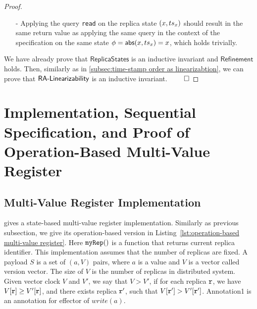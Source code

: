 \begin {proof}
\begin{itemize}
    Assume that $\alinord = \alabel''_1 \cdot \ldots \cdot \alabel''_m \cdot \alabel''_{m+1} \ldots$, $\alabel''_{m+1} = \alabellongind[{\tt write}]{a}{}{\ats_a}{}$. We already know that, the timestamp of $\alabel''_1,\ldots,\alabel''_m$ is less than $\ats_a$. Assume $S$ is obtained by applying the effectors of $\alabel''_1,\ldots,\alabel''_m$, and assume that $S = (x,\ats_x)$. It is easy to see that, $\ats_x < \ats_a$.

    Assume we obtain replica state $S'$ from $S$ by applying effector $(a,\ats_a)$; while in sequential specification we have $\abstate \xrightarrow{\alabelshort[{\tt write}]{a}} \abstate'$, and $\refmap(x,\ats_x) = \abstate = x$. We can see that $S' = (a,\ats_a)$ and $\abstate' = a$, and then, $\refmap(S') = \abstate'$.

\item[-] Applying the query {\tt read} on the replica state $(x,\ats_x)$ should result in the same return value as applying the same query in the context of the specification on the same state $\abstate = \refmap(x,\ats_x) = x$, which holds trivially.
\end{itemize}


We have already prove that $\mathsf{ReplicaStates}$ is an inductive invariant and $\mathsf{Refinement}$ holds. Then, similarly as in \sectionautorefname \ref{subsec:time-stamp order as linearizabtion}, we can prove that $\mathsf{\CRDTLinshort{}}$ is an inductive invariant. $\qed$
\end {proof}






\section{Implementation, Sequential Specification, and Proof of Operation-Based Multi-Value Register}
\label{sec:implementation, sequential specification, and proof of opeation-based multi-value register}


\subsection{Multi-Value Register Implementation}
\label{subsec:multi-value register implementation}


\cite{ShapiroPBZ11} gives a state-based multi-value register implementation. Similarly as previous subsection, we give its operation-based version in Listing~\ref{lst:operation-based multi-value register}. Here $\alabelshort[{\tt myRep}]{}$ is a function that returns current replica identifier. This implementation assumes that the number of replicas are fixed. A payload $S$ is a set of $(a,V)$ pairs, where $a$ is a value and $V$ is a vector called version vector. The size of $V$ is the number of replicas in distributed system. %
Given vector clock $V$ and $V'$, we say that $V > V'$, if for each replica $\arep$, we have $V[\arep] \geq V'[\arep]$, and there exists replica $\arep'$, such that $V[\arep'] > V'[\arep']$. Annotation1 is an annotation for effector of $write(a)$.


